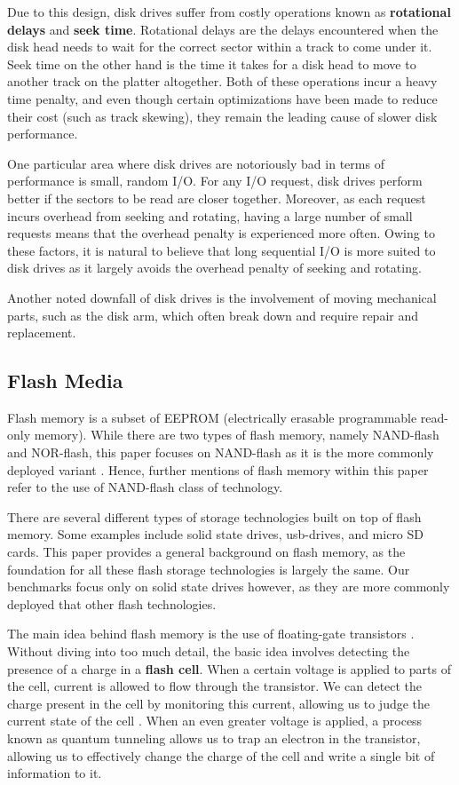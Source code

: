 \documentclass[10pt, author, twocolumn]{article}
\begin{document}
Due to this design, disk drives suffer from costly operations known as \textbf{rotational delays} and \textbf{seek time}. Rotational delays are the delays encountered when the disk head needs to wait for the correct sector within a track to come under it. Seek time on the other hand is the time it takes for a disk head to move to another track on the platter altogether. Both of these operations incur a heavy time penalty, and even though certain optimizations have been made to reduce their cost (such as track skewing), they remain the leading cause of slower disk performance. 

One particular area where disk drives are notoriously bad in terms of performance is small, random I/O. For any I/O request, disk drives perform better if the sectors to be read are closer together. Moreover, as each request incurs overhead from seeking and rotating, having a large number of small requests means that the overhead penalty is experienced more often. Owing to these factors, it is natural to believe that long sequential I/O is more suited to disk drives as it largely avoids the overhead penalty of seeking and rotating. 

Another noted downfall of disk drives is the involvement of moving mechanical parts, such as the disk arm, which often break down and require repair and replacement.

\subsection{Flash Media}

Flash memory is a subset of EEPROM (electrically erasable programmable read-only memory). While there are two types of flash memory, namely NAND-flash and NOR-flash, this paper focuses on NAND-flash as it is the more commonly deployed variant \cite{micheloni2010nand}. Hence, further mentions of flash memory within this paper refer to the use of NAND-flash class of technology. 

There are several different types of storage technologies built on top of flash memory. Some examples include solid state drives, usb-drives, and micro SD cards. This paper provides a general background on flash memory, as the foundation for all these flash storage technologies is largely the same. Our benchmarks focus only on solid state drives however, as they are more commonly deployed that other flash technologies.

The main idea behind flash memory is the use of floating-gate transistors \cite{micheloni2010nand}. Without diving into too much detail, the basic idea involves detecting the presence of a charge in a \textbf{flash cell}. When a certain voltage is applied to parts of the cell, current is allowed to flow through the transistor. We can detect the charge present in the cell by monitoring this current, allowing us to judge the current state of the cell \cite{micheloni2010nand}. When an even greater voltage is applied, a process known as quantum tunneling allows us to trap an electron in the transistor, allowing us to effectively change the charge of the cell and write a single bit of information to it.
\end{document}
